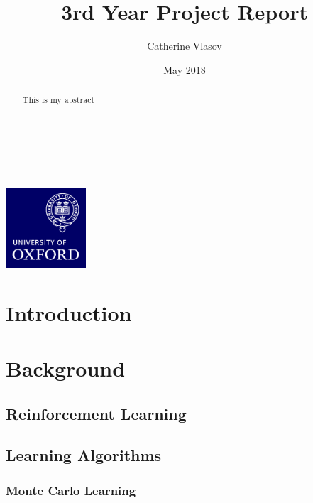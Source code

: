 \documentclass[11pt,a4paper]{report}
\author{Catherine Vlasov}
\title{3rd Year Project Report}
\date{May 2018}
\begin{document}
\makeatletter
	\begin{titlepage}
		\vspace*{\fill}
		\begin{center}
			{\huge \bfseries \@title }
			\\[4ex]
			{\LARGE  \@author}
			\\[2ex]
			{\large \@date}
			\\[50ex]
			\includegraphics[width=30mm]{oxlogo.png}
		\end{center}
		\vspace*{\fill}
	\end{titlepage}
\makeatother

\begin{abstract}
This is my abstract
\end{abstract}

\tableofcontents


\chapter{Introduction}


\chapter{Background}


\section{Reinforcement Learning}


\section{Learning Algorithms}


\subsection{Monte Carlo Learning}
\label{sec:MonteCarloLearning}

\label{sec:monteCarloPseudocode}




\end{document}
